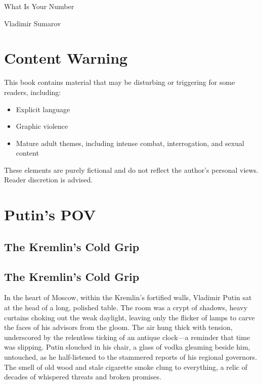 \documentclass[12pt]{book}
\begin{document}
\begin{titlepage}
    \centering
    \vspace*{3cm}
    {\fontsize{48}{60}\selectfont What Is Your Number\par} %
    \vspace{2cm}
    {\Large Vladimir Sumarov\par} %
\end{titlepage}
\clearpage

\chapter*{Content Warning}
This book contains material that may be disturbing or triggering for some readers, including:
\begin{itemize}
    \item Explicit language
    \item Graphic violence
    \item Mature adult themes, including intense combat, interrogation, and sexual content
\end{itemize}
These elements are purely fictional and do not reflect the author’s personal views. Reader discretion is advised.
\clearpage

\tableofcontents
\clearpage

\chapter{Putin's POV}

\section{The Kremlin's Cold Grip}

\section{The Kremlin’s Cold Grip}

In the heart of Moscow, within the Kremlin’s fortified walls, Vladimir Putin sat at the head of a long, polished table. The room was a crypt of shadows, heavy curtains choking out the weak daylight, leaving only the flicker of lamps to carve the faces of his advisors from the gloom. The air hung thick with tension, underscored by the relentless ticking of an antique clock—a reminder that time was slipping. Putin slouched in his chair, a glass of vodka gleaming beside him, untouched, as he half-listened to the stammered reports of his regional governors. The smell of old wood and stale cigarette smoke clung to everything, a relic of decades of whispered threats and broken promises.
\end{document}
